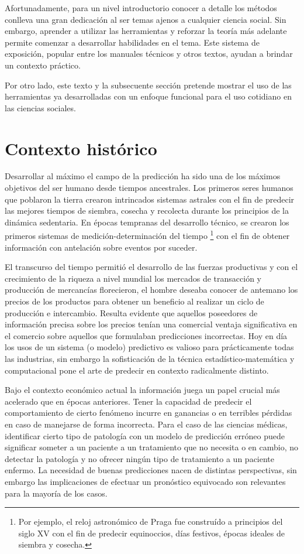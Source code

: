 \documentclass[letterpaper,12pt, spanish, oneside]{book} %
\let\oldfootnote\footnote
\renewcommand{\footnote}[1]{%
  \begingroup%
  \linespread{1.2}%
  \oldfootnote{#1}%
  \endgroup%
}
\begin{document}
Afortunadamente, para un nivel introductorio conocer a detalle los métodos conlleva una gran dedicación al ser temas ajenos a cualquier ciencia social. Sin embargo, aprender a utilizar las herramientas y reforzar la teoría más adelante permite comenzar a desarrollar habilidades en el tema. Este sistema de exposición, popular entre los manuales técnicos y otros textos, ayudan a brindar un contexto práctico.  

Por otro lado, este texto y la subsecuente sección pretende mostrar el uso de las herramientas ya desarrolladas con un enfoque funcional para el uso cotidiano en las ciencias sociales.

\section{Contexto histórico}

Desarrollar al máximo el campo de la predicción ha sido una de los máximos objetivos del ser humano desde tiempos ancestrales. Los primeros seres humanos que poblaron la tierra crearon intrincados sistemas astrales con el fin de predecir las mejores tiempos de siembra, cosecha y recolecta durante los principios de la dinámica sedentaria. En épocas tempranas del desarrollo técnico, se crearon los primeros sistemas de medición-determinación del tiempo\footnote{Por ejemplo, el reloj astronómico de Praga fue construído a principios del siglo XV con el fin de predecir equinoccios, días festivos, épocas ideales de siembra y cosecha.} con el fin de obtener información con antelación sobre eventos por suceder. 

El transcurso del tiempo permitió el desarrollo de las fuerzas productivas y con el crecimiento de la riqueza a nivel mundial los mercados de transacción y producción de mercancías florecieron, el hombre deseaba conocer de antemano los precios de los productos para obtener un beneficio al realizar un ciclo de producción e intercambio. Resulta evidente que aquellos poseedores de información precisa sobre los precios tenían una comercial ventaja significativa en el comercio sobre aquellos que formulaban predicciones incorrectas. Hoy en día los usos de un sistema (o modelo) predictivo es valioso para prácticamente todas las industrias, sin embargo la sofisticación de la técnica estadístico-matemática y computacional pone el arte de predecir en contexto radicalmente distinto.

Bajo el contexto económico actual la información juega un papel crucial más acelerado que en épocas anteriores. Tener la capacidad de predecir el comportamiento de cierto fenómeno incurre en ganancias o en terribles pérdidas en caso de manejarse de forma incorrecta. Para el caso de las ciencias médicas, identificar cierto tipo de patología con un modelo de predicción erróneo puede significar someter a un paciente a un tratamiento que no necesita o en cambio, no detectar la patología y no ofrecer ningún tipo de tratamiento a un paciente enfermo. La necesidad de buenas predicciones nacen de distintas perspectivas, sin embargo las implicaciones de efectuar un pronóstico equivocado son relevantes para la mayoría de los casos.
\end{document}
